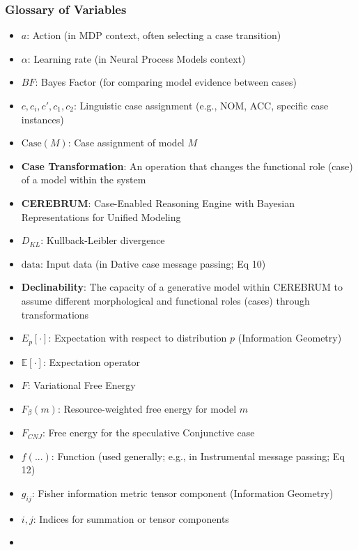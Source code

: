 \hypertarget{glossary-of-variables}{%
\subsubsection{Glossary of Variables}\label{glossary-of-variables}}

\begin{itemize}
\tightlist
\item
  \(a\): Action (in MDP context, often selecting a case transition)
\item
  \(\alpha\): Learning rate (in Neural Process Models context)
\item
  \(BF\): Bayes Factor (for comparing model evidence between cases)
\item
  \(c, c_i, c', c_1, c_2\): Linguistic case assignment (e.g., NOM, ACC,
  specific case instances)
\item
  \(\text{Case}(M)\): Case assignment of model \(M\)
\item
  \textbf{Case Transformation}: An operation that changes the functional
  role (case) of a model within the system
\item
  \textbf{CEREBRUM}: Case-Enabled Reasoning Engine with Bayesian
  Representations for Unified Modeling
\item
  \(D_{KL}\): Kullback-Leibler divergence
\item
  \(\text{data}\): Input data (in Dative case message passing; Eq 10)
\item
  \textbf{Declinability}: The capacity of a generative model within
  CEREBRUM to assume different morphological and functional roles
  (cases) through transformations
\item
  \(E_p[\cdot]\): Expectation with respect to distribution \(p\)
  (Information Geometry)
\item
  \(\mathbb{E}[\cdot]\): Expectation operator
\item
  \(F\): Variational Free Energy
\item
  \(F_{\beta}(m)\): Resource-weighted free energy for model \(m\)
\item
  \(F_{CNJ}\): Free energy for the speculative Conjunctive case
\item
  \(f(...)\): Function (used generally; e.g., in Instrumental message
  passing; Eq 12)
\item
  \(g_{ij}\): Fisher information metric tensor component (Information
  Geometry)
\item
  \(i, j\): Indices for summation or tensor components
\item

\end{itemize}
